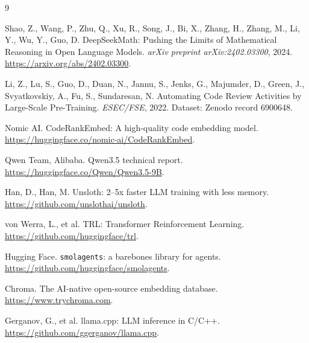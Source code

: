 \documentclass[11pt,a4paper]{article}
\begin{document}

\begin{thebibliography}{9}

Shao, Z., Wang, P., Zhu, Q., Xu, R., Song, J., Bi, X., Zhang, H., Zhang, M.,
Li, Y., Wu, Y., Guo, D.
\newblock DeepSeekMath: Pushing the Limits of Mathematical Reasoning in Open
Language Models.
\newblock \emph{arXiv preprint arXiv:2402.03300}, 2024.
\newblock \url{https://arxiv.org/abs/2402.03300}.

Li, Z., Lu, S., Guo, D., Duan, N., Jannu, S., Jenks, G., Majumder, D.,
Green, J., Svyatkovskiy, A., Fu, S., Sundaresan, N.
\newblock Automating Code Review Activities by Large-Scale Pre-Training.
\newblock \emph{ESEC/FSE}, 2022.
\newblock Dataset: Zenodo record 6900648.

Nomic AI.
\newblock CodeRankEmbed: A high-quality code embedding model.
\newblock \url{https://huggingface.co/nomic-ai/CodeRankEmbed}.

Qwen Team, Alibaba.
\newblock Qwen3.5 technical report.
\newblock \url{https://huggingface.co/Qwen/Qwen3.5-9B}.

Han, D., Han, M.
\newblock Unsloth: 2--5x faster LLM training with less memory.
\newblock \url{https://github.com/unslothai/unsloth}.

von Werra, L., et al.
\newblock TRL: Transformer Reinforcement Learning.
\newblock \url{https://github.com/huggingface/trl}.

Hugging Face.
\newblock \texttt{smolagents}: a barebones library for agents.
\newblock \url{https://github.com/huggingface/smolagents}.

Chroma.
\newblock The AI-native open-source embedding database.
\newblock \url{https://www.trychroma.com}.

Gerganov, G., et al.
\newblock llama.cpp: LLM inference in C/C++.
\newblock \url{https://github.com/ggerganov/llama.cpp}.

\end{thebibliography}
\end{document}
